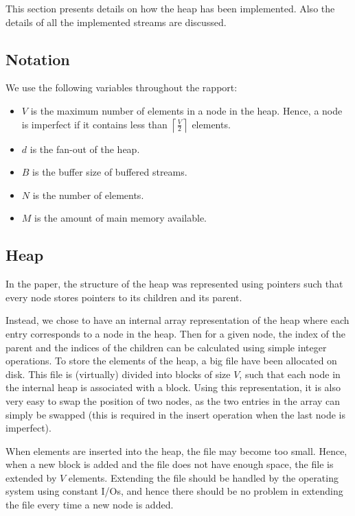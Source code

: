 This section presents details on how the heap has
been implemented. Also the details of
all the implemented streams are discussed.

\subsection{Notation}
\label{sec:implementation:parameters}

We use the following variables throughout the rapport:

\begin{itemize}
  \item $V$ is the maximum number of elements in a node in the heap. Hence, a
    node is imperfect if it contains less than $\left\lceil \frac{V}{2}
    \right\rceil$ elements.
  \item $d$ is the fan-out of the heap.
  \item $B$ is the buffer size of buffered streams.
  \item $N$ is the number of elements.
  \item $M$ is the amount of main memory available.
\end{itemize}

\subsection{Heap}
In the paper, the structure of the heap was represented using pointers
such that every node stores pointers to its children and its
parent.

Instead, we chose to have an internal array representation of the heap where
each entry corresponds to a node in the heap. Then for a given node, the
index of the parent and the indices of
the children can be calculated using simple integer operations.
To store the elements of the heap, a big file have been allocated on
disk. This file is (virtually) divided into blocks of size $V$, such
that each node in the internal heap is associated with a block.
Using this representation, it is also very easy to swap the position
of two nodes, as the two entries in the array can simply be swapped
(this is required in the insert operation when the last node is
imperfect).

When elements are inserted into the heap, the file may become too
small. Hence, when a new block is added and the file does not have
enough space, the file is extended by $V$ elements. Extending the file
should be handled by the operating system using constant I/Os, and
hence there should be no problem in extending the file every time a new
node is added.

